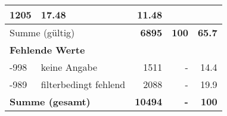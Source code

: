 \begin{longtable}{lXrrr}
       \num{1205} &
       \num[round-mode=places,round-precision=2]{17,48} &
         \num[round-mode=places,round-precision=2]{11,48} \\
     \midrule
     \multicolumn{2}{l}{Summe (gültig)} &
       \textbf{\num{6895}} &
     \textbf{100} &
       \textbf{\num[round-mode=places,round-precision=2]{65,7}} \\
     \multicolumn{5}{l}{\textbf{Fehlende Werte}}\\
       -998 &
       keine Angabe &
         \num{1511} &
        - &
         \num[round-mode=places,round-precision=2]{14,4} \\
       -989 &
       filterbedingt fehlend &
         \num{2088} &
        - &
         \num[round-mode=places,round-precision=2]{19,9} \\
     \midrule
     \multicolumn{2}{l}{\textbf{Summe (gesamt)}} &
          \textbf{\num{10494}} &
        \textbf{-} &
        \textbf{100} \\
     \bottomrule
     \end{longtable}
     
